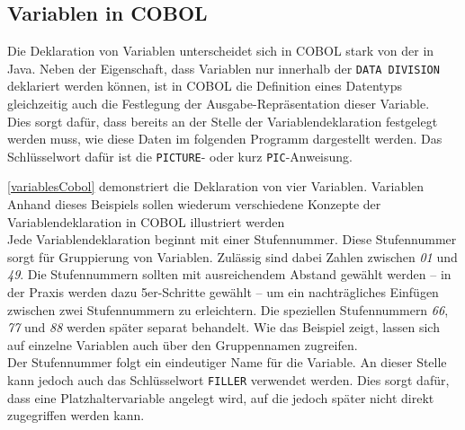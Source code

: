 \subsection*{Variablen in COBOL}
Die Deklaration von Variablen unterscheidet sich in COBOL stark von der in Java. Neben der Eigenschaft, dass Variablen nur innerhalb der \texttt{DATA DIVISION} deklariert werden können, ist in COBOL die Definition eines Datentyps gleichzeitig auch die Festlegung der Ausgabe-Repräsentation dieser Variable. \\

Dies sorgt dafür, dass bereits an der Stelle der Variablendeklaration festgelegt werden muss, wie diese Daten im folgenden Programm dargestellt werden. Das Schlüsselwort dafür ist die \texttt{PICTURE}- oder kurz \texttt{PIC}-Anweisung.\\

\sepCodeAndOutputCheck
{}

\autoref{variablesCobol} demonstriert die Deklaration von vier Variablen. Variablen Anhand dieses Beispiels sollen wiederum verschiedene Konzepte der Variablendeklaration in COBOL illustriert werden\\

Jede Variablendeklaration beginnt mit einer Stufennummer. Diese Stufennummer sorgt für Gruppierung von Variablen. Zulässig sind dabei Zahlen zwischen \textit{01} und \textit{49}. Die Stufennummern sollten mit ausreichendem Abstand gewählt werden -- in der Praxis werden dazu 5er-Schritte gewählt --  um ein nachträgliches Einfügen zwischen zwei Stufennummern zu erleichtern. Die speziellen Stufennummern \textit{66}, \textit{77} und \textit{88} werden später separat behandelt. Wie das Beispiel zeigt, lassen sich auf einzelne Variablen auch über den Gruppennamen zugreifen. \\

Der Stufennummer folgt ein eindeutiger Name für die Variable. An dieser Stelle kann jedoch auch das Schlüsselwort \texttt{FILLER} verwendet werden. Dies sorgt dafür, dass eine Platzhaltervariable angelegt wird, auf die jedoch später nicht direkt zugegriffen werden kann.\\

